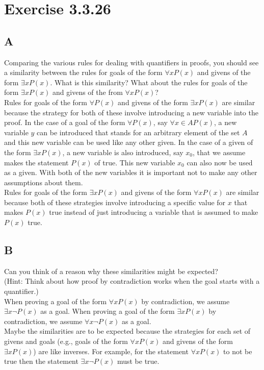 \documentclass{article}
\newcommand{\n}{ \noindent }
\begin{document}
\section*{Exercise 3.3.26}

\subsection*{A}
Comparing the various rules for dealing with quantifiers in proofs, you should see a similarity between the rules for goals of the form $\forall x P(x)$ and givens of the form $\exists x P(x)$. What is this similarity? What about the rules for goals of the form $\exists x P(x)$ and givens of the from $\forall x P(x)$? \\

\n Rules for goals of the form $\forall P(x)$ and givens of the form $\exists x P(x)$ are similar because the strategy for both of these involve introducing a new variable into the proof. In the case of a goal of the form $\forall P(x)$, say $\forall x \in A P(x)$, a new variable $y$ can be introduced that stands for an arbitrary element of the set $A$ and this new variable can be used like any other given. In the case of a given of the form $\exists x P(x)$, a new variable is also introduced, say $x_0$, that we assume makes the statement $P(x)$ of true. This new variable $x_0$ can also now be used as a given. With both of the new variables it is important not to make any other assumptions about them. \\

\n Rules for goals of the form $\exists x P(x)$ and givens of the form $\forall x P(x)$ are similar because both of these strategies involve introducing a specific value for $x$ that makes $P(x)$ true instead of just introducing a variable that is assumed to make $P(x)$ true.

\subsection*{B}
Can you think of a reason why these similarities might be expected? \\
\n (Hint: Think about how proof by contradiction works when the goal starts with a quantifier.)\\

\n When proving a goal of the form $\forall x P(x)$ by contradiction, we assume $\exists x \neg P(x)$ as a goal. When proving a goal of the form $\exists x P(x)$ by contradiction, we assume $\forall x \neg P(x)$ as a goal.\\

\n Maybe the similarities are to be expected because the strategies for each set of givens and goals (e.g., goals of the form $\forall x P(x)$ and givens of the form $\exists x P(x)$) are like inverses. For example, for the statement $\forall x P(x)$ to not be true then the statement $\exists x \neg P(x)$ must be true.
\end{document}
